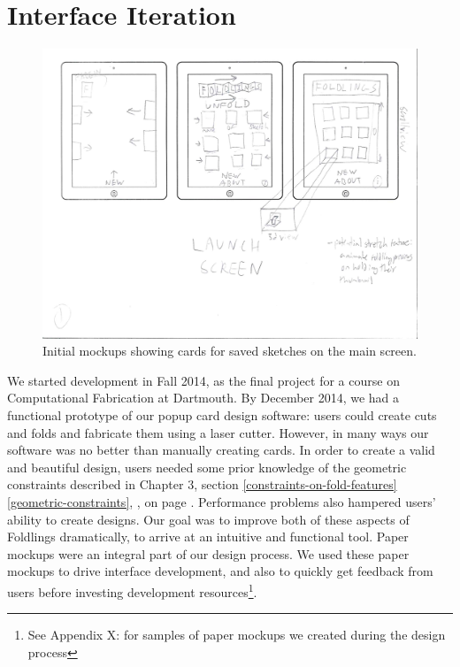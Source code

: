 \section{Interface Iteration}\label{interface-iteration}

\begin{figure}[htbp]
\centering
\includegraphics{figures/90_Appendix_UI_Mockups/001.png}
\caption{Initial mockups showing cards for saved sketches on the main
screen.}
\end{figure}

We started development in Fall 2014, as the final project for a course
on Computational Fabrication at Dartmouth. By December 2014, we had a
functional prototype of our popup card design software: users could
create cuts and folds and fabricate them using a laser cutter. However,
in many ways our software was no better than manually creating cards. In
order to create a valid and beautiful design, users needed some prior
knowledge of the geometric constraints described in Chapter 3, section
\ref{constraints-on-fold-features} \ref{geometric-constraints},
, on page
\pageref{geometric-constraints}. Performance problems also hampered
users' ability to create designs. Our goal was to improve both of these
aspects of Foldlings dramatically, to arrive at an intuitive and
functional tool. Paper mockups were an integral part of our design
process. We used these paper mockups to drive interface development, and
also to quickly get feedback from users before investing development
resources\footnote{See Appendix X: for samples of paper mockups we
  created during the design process}.

